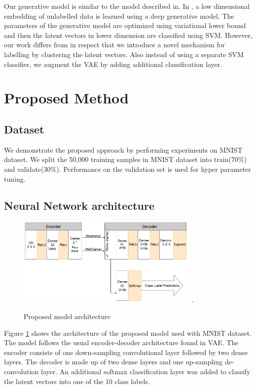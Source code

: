 \documentclass[runningheads]{llncs}
\begin{document}
Our generative model is similar to the model described in\cite{kingma_2014}.
In \cite{kingma_2014}, a low dimensional embedding of unlabelled data is learned using a deep generative model.
The parameters of the generative model are optimized using variational lower bound and then the latent vectors in lower dimension are classified using SVM.
However, our work differs from \cite{kingma_2014} in respect that we introduce a novel mechanism for labelling by clustering the latent vectors.
Also instead of using a separate SVM classifier, we augment the VAE by adding additional classification layer.

\section{Proposed Method}

\subsection{Dataset}
We demonstrate the proposed approach by performing experiments on MNIST dataset.
We split the 50,000 training samples in MNIST dataset into train(70\%) and validate(30\%).
Performance on the validation set is used for hyper parameter tuning.

\subsection{Neural Network architecture}

\begin{figure}[!t]
\centering
\includegraphics[width=3.5in]{vae_arch_v4}
\DeclareGraphicsExtensions.
\caption{Proposed model architecture}
\label{vae_architecture}
\end{figure}

Figure \ref{vae_architecture} shows the architecture of the proposed model used with MNIST dataset.
The model follows the usual encoder-decoder architecture found in VAE.
The encoder consists of one down-sampling convolutional layer followed by two dense layers.
The decoder is made up of two dense layers and one up-sampling de-convolution layer.
An additional softmax classification layer was added to classify the latent vectors into one of the 10 class labels.
\end{document}
